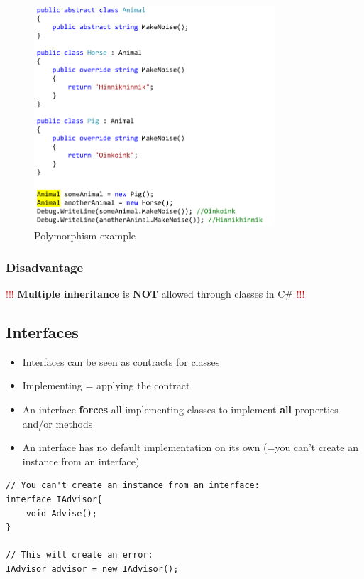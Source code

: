 \documentclass{article}
\newcommand{\bold}[1]{\textbf{#1}}
\begin{document}
\begin{figure}[H]
    \centering
    \includegraphics[width=0.8\textwidth]{polymorphism.png}
    \caption{Polymorphism example}
\end{figure}

\subsubsection{Disadvantage}

\textcolor{red}{!!!} \bold{Multiple inheritance} is \bold{NOT} allowed through classes in C\# \textcolor{red}{!!!}

\subsection{Interfaces}

\begin{itemize}
    \item Interfaces can be seen as contracts for classes
    \item Implementing = applying the contract
    \item An interface \bold{forces} all implementing classes to implement \bold{all} properties and/or methods
    \item An interface has no default implementation on its own (=you can't create an instance from an interface)
\end{itemize}

\begin{verbatim}
// You can't create an instance from an interface:
interface IAdvisor{
    void Advise();
}

// This will create an error:
IAdvisor advisor = new IAdvisor();
\end{verbatim}
\end{document}
